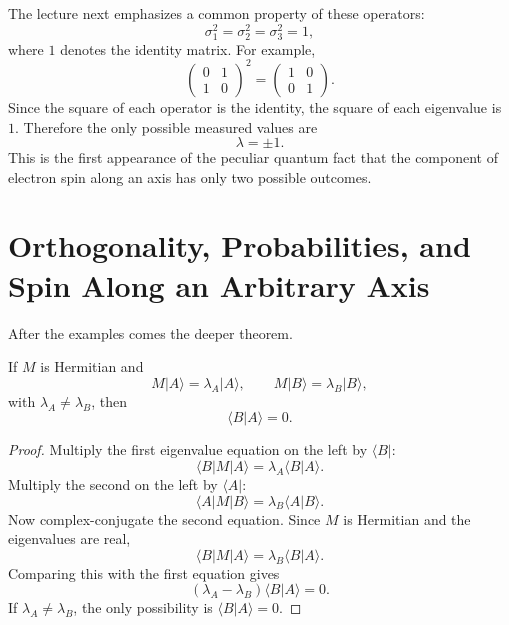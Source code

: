The lecture next emphasizes a common property of these operators:
\begin{equation}
\sigma_1^2=\sigma_2^2=\sigma_3^2=1,
\end{equation}
where \(1\) denotes the identity matrix. For example,
\begin{equation}
\begin{pmatrix}
0&1\\
1&0
\end{pmatrix}^2
=
\begin{pmatrix}
1&0\\
0&1
\end{pmatrix}.
\end{equation}
Since the square of each operator is the identity, the square of each eigenvalue is \(1\). Therefore the only possible measured values are
\begin{equation}
\lambda=\pm 1.
\end{equation}
This is the first appearance of the peculiar quantum fact that the component of electron spin along an axis has only two possible outcomes.

\section{Orthogonality, Probabilities, and Spin Along an Arbitrary Axis}

After the examples comes the deeper theorem.

\begin{theorem}
If \(M\) is Hermitian and
\begin{equation}
M|A\rangle=\lambda_A|A\rangle,
\qquad
M|B\rangle=\lambda_B|B\rangle,
\end{equation}
with \(\lambda_A\neq \lambda_B\), then
\begin{equation}
\langle B|A\rangle=0.
\end{equation}
\end{theorem}

\begin{proof}
Multiply the first eigenvalue equation on the left by \(\langle B|\):
\begin{equation}
\langle B|M|A\rangle=\lambda_A\langle B|A\rangle.
\end{equation}
Multiply the second on the left by \(\langle A|\):
\begin{equation}
\langle A|M|B\rangle=\lambda_B\langle A|B\rangle.
\end{equation}
Now complex-conjugate the second equation. Since \(M\) is Hermitian and the eigenvalues are real,
\begin{equation}
\langle B|M|A\rangle=\lambda_B\langle B|A\rangle.
\end{equation}
Comparing this with the first equation gives
\begin{equation}
(\lambda_A-\lambda_B)\langle B|A\rangle=0.
\end{equation}
If \(\lambda_A\neq\lambda_B\), the only possibility is \(\langle B|A\rangle=0\).
\end{proof}

